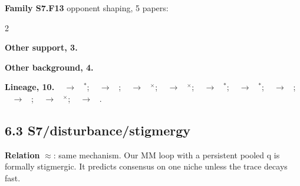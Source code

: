 \documentclass[10pt]{article}
\newcommand{\memb}[1]{\par\smallskip\textbf{#1}\quad}
\begin{document}
\memb{Family S7.F13} opponent shaping, 5 papers: {\footnotesize \citetext{\citealp{Foerster-learning18}; \citealp{Letcher-stable19}; \citealp{Mguni-coordinating19}; \citealp{Yang-learning20}; \citealp{Lu-model22}}}

\begin{multicols}{2}
\memb{Other support, 3.} \citetext{\citealp{Lee-outsourcing22}; \citealp{SanchezFibla-cooperative22}; \citealp{Constant-variational18}}

\memb{Other background, 4.} {\footnotesize \citetext{\citealp{Baker-emergent20}; \citealp{Dennis-emergent20}; \citealp{Samvelyan-maestro23}; \citealp{Friston-variational23}}}

\end{multicols}
\memb{Lineage, 10.} {\footnotesize \citeauthor{OdlingSmee-niche96}~\citeyear{OdlingSmee-niche96} $\to$ \citeauthor{Laland-evolutionary99}~\citeyear{Laland-evolutionary99}$^\ast$; \citeauthor{OdlingSmee-niche96}~\citeyear{OdlingSmee-niche96} $\to$ \citeauthor{Krakauer-diversity09}~\citeyear{Krakauer-diversity09}; \citeauthor{Laland-evolutionary99}~\citeyear{Laland-evolutionary99} $\to$ \citeauthor{Williams-flask07}~\citeyear{Williams-flask07}$^\times$; \citeauthor{Laland-evolutionary99}~\citeyear{Laland-evolutionary99} $\to$ \citeauthor{McDonaldGibson-environmental08}~\citeyear{McDonaldGibson-environmental08}$^\times$; \citeauthor{Laland-evolutionary99}~\citeyear{Laland-evolutionary99} $\to$ \citeauthor{Bruineberg-free18}~\citeyear{Bruineberg-free18}$^\ast$; \citeauthor{Laland-evolutionary99}~\citeyear{Laland-evolutionary99} $\to$ \citeauthor{Constant-variational18}~\citeyear{Constant-variational18}$^\ast$; \citeauthor{Laland-evolutionary99}~\citeyear{Laland-evolutionary99} $\to$ \citeauthor{Friston-variational23}~\citeyear{Friston-variational23}; \citeauthor{Krakauer-diversity09}~\citeyear{Krakauer-diversity09} $\to$ \citeauthor{Kylafis-niche10}~\citeyear{Kylafis-niche10}; \citeauthor{Friston-duet15}~\citeyear{Friston-duet15} $\to$ \citeauthor{Constant-variational18}~\citeyear{Constant-variational18}$^\times$; \citeauthor{Peysakhovich-prosocial17}~\citeyear{Peysakhovich-prosocial17} $\to$ \citeauthor{Mguni-coordinating19}~\citeyear{Mguni-coordinating19}.}

\subsection{6.3 S7/disturbance/stigmergy}\label{node:S7-S7-disturbance-stigmergy}
\textbf{Relation} $\approx$: same mechanism. Our MM loop with a persistent pooled q is formally stigmergic. It predicts consensus on one niche unless the trace decays fast.
\end{document}
